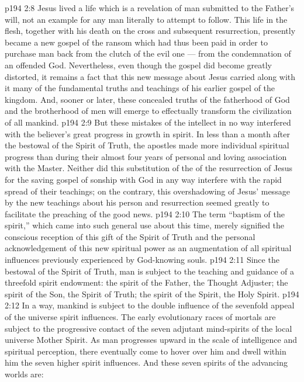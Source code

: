 \vs p194 2:8 \pc Jesus lived a life which is a revelation of man submitted to the Father’s will, not an example for any man literally to attempt to follow. This life in the flesh, together with his death on the cross and subsequent resurrection, presently became a new gospel of the ransom which had thus been paid in order to purchase man back from the clutch of the evil one --- from the condemnation of an offended God. Nevertheless, even though the gospel did become greatly distorted, it remains a fact that this new message about Jesus carried along with it many of the fundamental truths and teachings of his earlier gospel of the kingdom. And, sooner or later, these concealed truths of the fatherhood of God and the brotherhood of men will emerge to effectually transform the civilization of all mankind.
\vs p194 2:9 But these mistakes of the intellect in no way interfered with the believer’s great progress in growth in spirit. In less than a month after the bestowal of the Spirit of Truth, the apostles made more individual spiritual progress than during their almost four years of personal and loving association with the Master. Neither did this substitution of the  of the resurrection of Jesus for the saving gospel  of sonship with God in any way interfere with the rapid spread of their teachings; on the contrary, this overshadowing of Jesus’ message by the new teachings about his person and resurrection seemed greatly to facilitate the preaching of the good news.
\vs p194 2:10 \pc The term “baptism of the spirit,” which came into such general use about this time, merely signified the conscious reception of this gift of the Spirit of Truth and the personal acknowledgement of this new spiritual power as an augmentation of all spiritual influences previously experienced by God\hyp{}knowing souls.
\vs p194 2:11 \pc Since the bestowal of the Spirit of Truth, man is subject to the teaching and guidance of a threefold spirit endowment: the spirit of the Father, the Thought Adjuster; the spirit of the Son, the Spirit of Truth; the spirit of the Spirit, the Holy Spirit.
\vs p194 2:12 In a way, mankind is subject to the double influence of the sevenfold appeal of the universe spirit influences. The early evolutionary races of mortals are subject to the progressive contact of the seven adjutant mind\hyp{}spirits of the local universe Mother Spirit. As man progresses upward in the scale of intelligence and spiritual perception, there eventually come to hover over him and dwell within him the seven higher spirit influences. And these seven spirits of the advancing worlds are:
